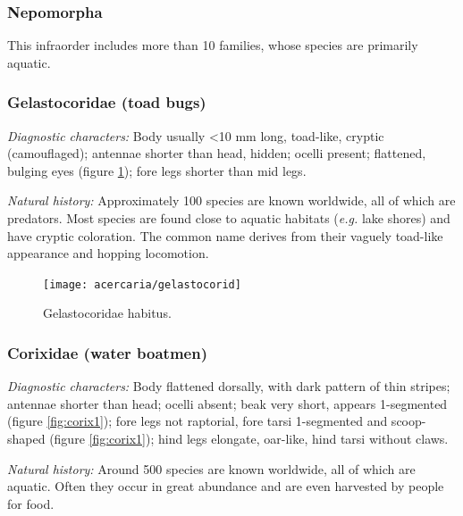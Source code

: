 \subsubsection{Nepomorpha}
This infraorder includes more than 10 families, whose species are primarily aquatic.

\subsubsection{Gelastocoridae (toad bugs)}%
\noindent{}\textit{Diagnostic characters:} Body usually \textless{}10 mm long, toad-like, cryptic (camouflaged); antennae shorter than head, hidden; ocelli present; flattened, bulging eyes (figure \ref{fig:gelasto1}); fore legs shorter than mid legs.\vspace{3mm}

\noindent{}\textit{Natural history:} Approximately 100 species are known worldwide, all of which are predators. Most species are found close to aquatic habitats (\textit{e.g.} lake shores) and have cryptic coloration. The common name derives from their vaguely toad-like appearance and hopping locomotion.\vspace{3mm}

\begin{figure}[ht!]
 \centering
 \texttt{[image: acercaria/gelastocorid]}
 \caption{Gelastocoridae habitus. \citep[][Fig. 7:21a]{bhlitem126080aquatic}}
 \label{fig:gelasto1}
\end{figure}

\subsubsection{Corixidae (water boatmen)}
\noindent{}\textit{Diagnostic characters:} Body flattened dorsally, with dark pattern of thin stripes; antennae shorter than head; ocelli absent; beak very short, appears 1-segmented (figure \ref{fig:corix1}); fore legs not raptorial, fore tarsi 1-segmented and scoop-shaped (figure \ref{fig:corix1}); hind legs elongate, oar-like, hind tarsi without claws.\vspace{3mm}

\noindent{}\textit{Natural history:} Around 500 species are known worldwide, all of which are aquatic. Often they occur in great abundance and are even harvested by people for food.\vspace{3mm}

